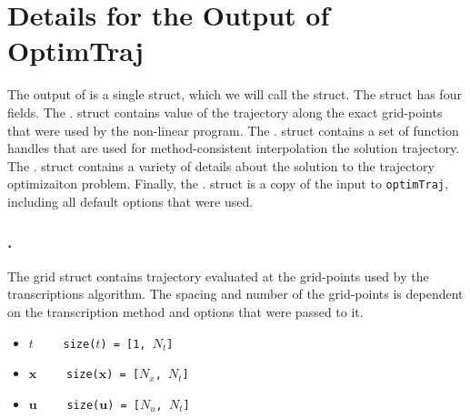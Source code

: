 \section{Details for the Output of OptimTraj}
The output of  is a single struct, which we will call the  struct. The  struct has four fields. The . struct contains value of the trajectory along the exact grid-points that were used by the non-linear program.  The . struct contains a set of function handles that are used for method-consistent interpolation the solution trajectory. The . struct contains a variety of details about the solution to the trajectory optimizaiton problem. Finally, the . struct is a copy of the input to \texttt{optimTraj}, including all default options that were used.


\subsubsection*{.}
The grid struct contains trajectory evaluated at the grid-points used by the transcriptions algorithm. The spacing and number of the grid-points is dependent on the transcription method and options that were passed to it.
\begin{itemize} \setlength\itemsep{-0.1em}
\item {}\tc{ = }$t \qquad$ \texttt{size($t$) = [1, $N_t$]}   
\item {}\tc{ = }$\bm{x} \qquad$ \texttt{size($\bm{x}$) = [$N_x$, $N_t$]}  
\item {}\tc{ = }$\bm{u} \qquad$ \texttt{size($\bm{u}$) = [$N_u$, $N_t$]}
\end{itemize}


